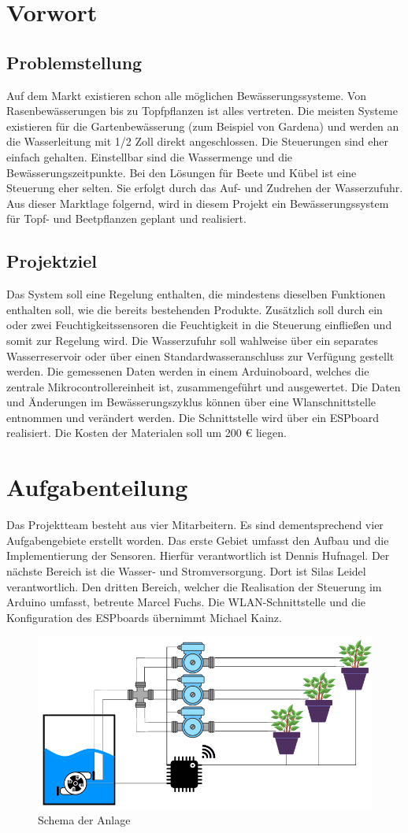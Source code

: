 \section{Vorwort}
\subsection{Problemstellung}

Auf dem Markt existieren schon alle möglichen Bewässerungssysteme. Von Rasenbewässerungen bis zu Topfpflanzen ist alles vertreten. Die meisten Systeme existieren für die Gartenbewässerung (zum Beispiel von Gardena) und werden an
die Wasserleitung mit 1/2 Zoll direkt angeschlossen. Die Steuerungen sind eher einfach gehalten. Einstellbar sind die Wassermenge und die Bewässerungszeitpunkte. Bei den Lösungen für Beete und Kübel ist eine Steuerung eher selten. Sie erfolgt
durch das Auf- und Zudrehen der Wasserzufuhr. Aus dieser Marktlage folgernd, wird in diesem Projekt ein Bewässerungssystem für Topf- und Beetpflanzen geplant und realisiert.

\subsection{Projektziel}
Das System soll eine Regelung enthalten, die mindestens dieselben Funktionen enthalten soll, wie die bereits bestehenden Produkte. Zusätzlich soll durch  ein oder zwei Feuchtigkeitssensoren die Feuchtigkeit in die Steuerung einfließen
und somit zur Regelung wird. Die Wasserzufuhr soll wahlweise über ein separates Wasserreservoir oder über einen Standardwasseranschluss zur Verfügung gestellt werden. Die gemessenen Daten werden in einem Arduinoboard, welches die
zentrale Mikrocontrollereinheit ist, zusammengeführt und ausgewertet. Die Daten und Änderungen im Bewässerungszyklus können über eine Wlanschnittstelle entnommen und verändert werden. Die Schnittstelle wird über ein ESPboard realisiert.
Die Kosten der Materialen soll um 200 \euro{} liegen.

\section{Aufgabenteilung}
Das Projektteam besteht aus vier Mitarbeitern. Es sind dementsprechend vier Aufgabengebiete erstellt worden. Das erste Gebiet umfasst den Aufbau und die Implementierung der Sensoren. Hierfür verantwortlich ist Dennis Hufnagel.
Der nächste Bereich ist die Wasser- und Stromversorgung. Dort ist Silas Leidel verantwortlich. Den dritten Bereich, welcher die Realisation der Steuerung im Arduino umfasst, betreute Marcel Fuchs. Die WLAN-Schnittstelle und
die Konfiguration des ESPboards übernimmt Michael Kainz.

\begin{figure}[ht]
    \centering
    \includegraphics[width=\textwidth]{silas/blockschaltbild}
    \caption{Schema der Anlage}
\end{figure}